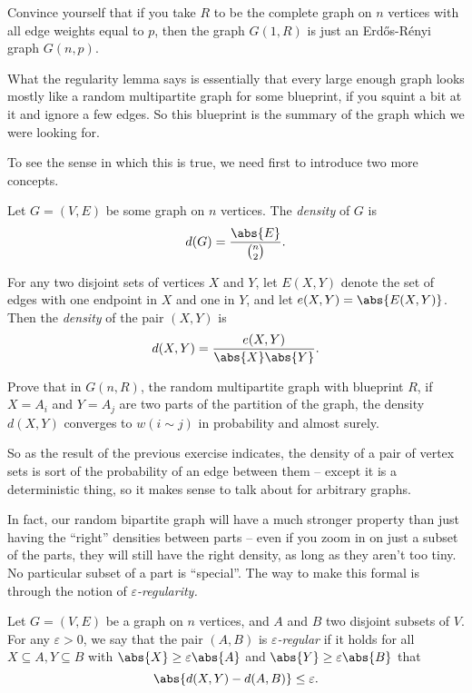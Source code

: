 \documentclass[nobib]{tufte-handout}
\begin{document}
\begin{xca}
  Convince yourself that if you take $R$ to be the complete graph on $n$ vertices with all edge weights equal to $p$, then the graph $G(1,R)$ is just an Erd\H{o}s-Rényi graph $G(n,p)$.
\end{xca}

What the regularity lemma says is essentially that every large enough graph looks mostly like a random multipartite graph for some blueprint, if you squint a bit at it and ignore a few edges. So this blueprint is the summary of the graph which we were looking for.

To see the sense in which this is true, we need first to introduce two more concepts.

\begin{definition}
  Let $G = (V,E)$ be some graph on $n$ vertices. The \emph{density} of $G$ is
  $$d(G) = \frac{\abs{E}}{\binom{n}{2}}.$$

  For any two disjoint sets of vertices $X$ and $Y$, let $E(X,Y)$ denote the set of edges with one endpoint in $X$ and one in $Y$, and let $e(X,Y) = \abs{E(X,Y)}$. Then the \emph{density} of the pair $(X,Y)$ is
  $$d(X,Y) = \frac{e(X,Y)}{\abs{X}\abs{Y}}.$$
\end{definition}

\begin{xca}
  Prove that in $G(n,R)$, the random multipartite graph with blueprint $R$, if $X = A_i$ and $Y = A_j$ are two parts of the partition of the graph, the density $d(X,Y)$ converges to $w(i \sim j)$ in probability and almost surely.
\end{xca}

So as the result of the previous exercise indicates, the density of a pair of vertex sets is sort of the probability of an edge between them -- except it is a deterministic thing, so it makes sense to talk about for arbitrary graphs.

In fact, our random bipartite graph will have a much stronger property than just having the ``right'' densities between parts -- even if you zoom in on just a subset of the parts, they will still have the right density, as long as they aren't too tiny. No particular subset of a part is ``special''. The way to make this formal is through the notion of \emph{$\varepsilon$-regularity.}

\begin{definition}
  Let $G = (V,E)$ be a graph on $n$ vertices, and $A$ and $B$ two disjoint subsets of $V$. For any $\varepsilon > 0$, we say that the pair $(A,B)$ is \emph{$\varepsilon$-regular} if it holds for all $X \subseteq A, Y \subseteq B$ with $\abs{X} \geq \varepsilon\abs{A}$ and $\abs{Y} \geq \varepsilon\abs{B}$ that
  $$\abs{d(X,Y) - d(A,B)} \leq \varepsilon.$$
\end{definition}
\end{document}

